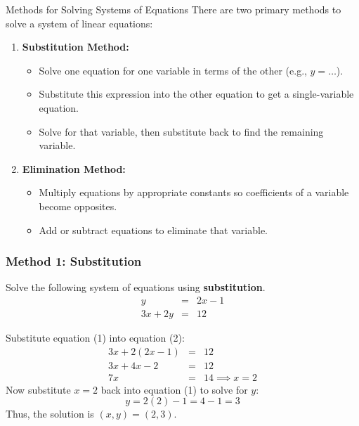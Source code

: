 \begin{frame}{Methods for Solving Systems of Equations}
There are two primary methods to solve a system of linear equations:
\begin{enumerate}
\item \textbf{Substitution Method:}
\begin{itemize}
\item Solve one equation for one variable in terms of the other (e.g., $y = \dots$).
\item Substitute this expression into the other equation to get a single-variable equation.
\item Solve for that variable, then substitute back to find the remaining variable.
\end{itemize}
\item \textbf{Elimination Method:}
\begin{itemize}
\item Multiply equations by appropriate constants so coefficients of a variable become opposites.
\item Add or subtract equations to eliminate that variable.
\end{itemize}
\end{enumerate}
\end{frame}

\begin{frame}[t]
\frametitle{Method 1: Substitution}
\begin{ex}
Solve the following system of equations using \textbf{substitution}.
\begin{eqnarray}
y &=& 2x - 1 \\
3x + 2y &=& 12
\end{eqnarray}
\end{ex}
\begin{sol}
Substitute equation (1) into equation (2):
\begin{eqnarray*}
3x + 2(2x - 1) &=& 12 \\
3x + 4x - 2 &=& 12 \\
7x &=& 14 \implies x = 2
\end{eqnarray*}
Now substitute $x = 2$ back into equation (1) to solve for $y$:
\[ y = 2(2) - 1 = 4 - 1 = 3 \]
Thus, the solution is $(x, y) = (2, 3)$.
\end{sol}
\end{frame}

